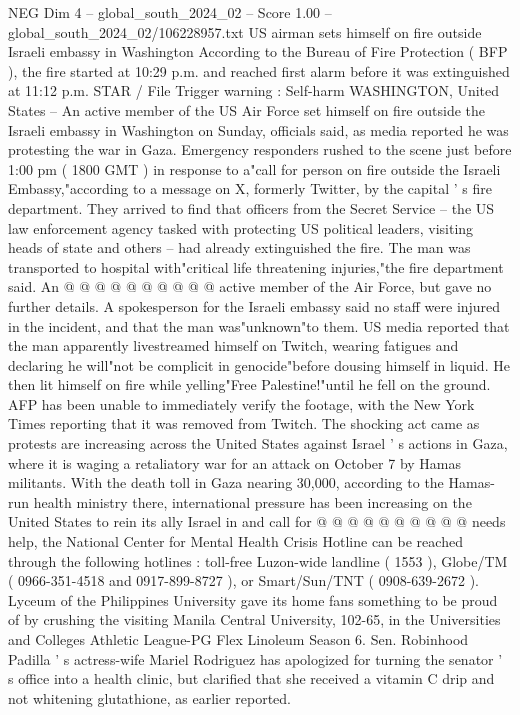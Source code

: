 \begin{textsample}{NEG Dim 4 – global\_south\_2024\_02 – Score 1.00 – global\_south\_2024\_02/106228957.txt}  \label{ex:f4_neg_387}
US airman sets himself on fire outside Israeli embassy in Washington According to the Bureau of Fire Protection ( BFP ), the fire started at 10:29 p.m. and reached first alarm before it was extinguished at 11:12 p.m.
STAR / File Trigger warning : Self-harm WASHINGTON, United States -- An active member of the US Air Force set himself on fire outside the Israeli embassy in Washington on Sunday, officials said, as media reported he was protesting the war in Gaza.
Emergency responders rushed to the scene just before 1:00 pm ( 1800 GMT ) in response to a"call for person on fire outside the Israeli Embassy,"according to a message on X, formerly Twitter, by the capital ' s fire department.
They arrived to find that officers from the Secret Service -- the US law enforcement agency tasked with protecting US political leaders, visiting heads of state and others -- had already extinguished the fire.
The man was transported to hospital with"critical life threatening injuries,"the fire department said.
An @ @ @ @ @ @ @ @ @ @ active member of the Air Force, but gave no further details.
A spokesperson for the Israeli embassy said no staff were injured in the incident, and that the man was"unknown"to them.
US media reported that the man apparently livestreamed himself on Twitch, wearing fatigues and declaring he will"not be complicit in genocide"before dousing himself in liquid.
He then lit himself on fire while yelling"Free Palestine!"until he fell on the ground.
AFP has been unable to immediately verify the footage, with the New York Times reporting that it was removed from Twitch.
The shocking act came as protests are increasing across the United States against Israel ' s actions in Gaza, where it is waging a retaliatory war for an attack on October 7 by Hamas militants.
With the death toll in Gaza nearing 30,000, according to the Hamas-run health ministry there, international pressure has been increasing on the United States to rein its ally Israel in and call for @ @ @ @ @ @ @ @ @ @ needs help, the National Center for Mental Health Crisis Hotline can be reached through the following hotlines : toll-free Luzon-wide landline ( 1553 ), Globe/TM ( 0966-351-4518 and 0917-899-8727 ), or Smart/Sun/TNT ( 0908-639-2672 ).
Lyceum of the Philippines University gave its home fans something to be proud of by crushing the visiting Manila Central University, 102-65, in the Universities and Colleges Athletic League-PG Flex Linoleum Season 6.
Sen.
Robinhood Padilla ' s actress-wife Mariel Rodriguez has apologized for turning the senator ' s office into a health clinic, but clarified that she received a vitamin C drip and not whitening glutathione, as earlier reported.

\end{textsample}
